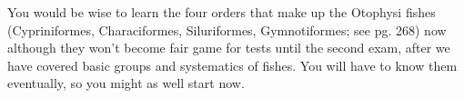 \documentclass[letterpaper]{tufte-handout}
\begin{document}
You would be wise to learn the four orders that make up the Otophysi fishes (Cypriniformes, Characiformes, Siluriformes, Gymnotiformes; see pg. 268) now although they won’t become fair game for tests until the second exam, after we have covered basic groups and systematics of fishes.  You will have to know them eventually, so you might as well start now.
\end{document}
